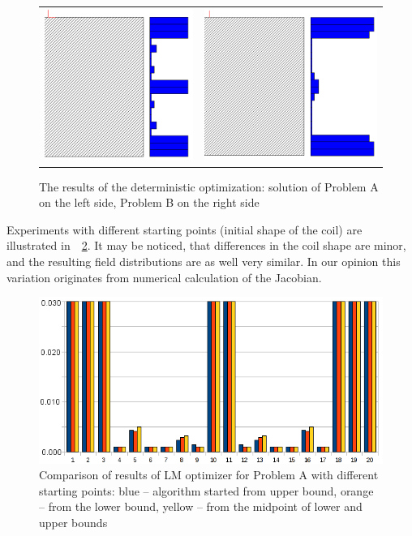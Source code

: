 \documentclass[twocolumn,a4paper]{article}
\def\rref#1{\figurename~\ref{#1}}
\begin{document}
\begin{figure}[htb]
\begin{center}
\begin{tabular}{m{}m{}}
 \centering\includegraphics[height=0.35\columnwidth]{img/LMOpt_coil_0p03.png} &
 \centering\includegraphics[height=0.35\columnwidth]{img/LMOpt_coil_0p05.png}
\end{tabular}
 \caption{The results of the deterministic optimization: solution of Problem A on the left side, Problem B on the right side}
 \label{fig6}
 \end{center}
\end{figure}

Experiments with different starting points (initial shape of the coil) are illustrated in~\rref{fig7}. It may be noticed, that differences in the coil shape are minor, and the resulting field distributions are as well very similar. In our opinion this variation originates from numerical calculation of the Jacobian.

\begin{figure}[htb]
\begin{center}
 \includegraphics[width=0.95\linewidth]{img/por_cewek3a.png}
 \caption{Comparison of results of LM optimizer for Problem A with different starting points: blue -- algorithm started from upper bound, orange -- from the lower bound, yellow -- from the midpoint of lower and upper bounds}
 \label{fig7}
 \end{center}
\end{figure}
\end{document}
